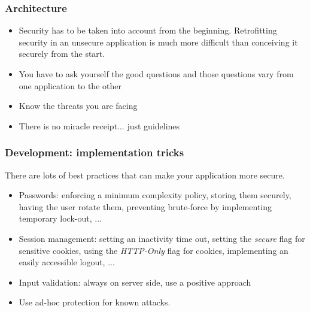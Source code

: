 \begin{frame}
\frametitle{Architecture}
\begin{itemize}
\item Security has to be taken into account from the beginning.
	\newline
	Retrofitting security in an unsecure application is much more difficult
	than conceiving it securely from the start.
\item You have to ask yourself the good questions and those questions vary
	from one application to the other
\item Know the threats you are facing
\item There is no miracle receipt... just guidelines
\end{itemize}
\end{frame}

\begin{frame}
\frametitle{Development: implementation tricks}

There are lots of best practices that can make your application more
secure.

\begin{itemize}
\item Passwords: enforcing a minimum complexity policy, storing them securely,
having the user rotate them, preventing brute-force by implementing temporary
lock-out, ...
\item Session management: setting an inactivity time out, setting the
\emph{secure} flag for sensitive cookies, using the \emph{HTTP-Only} flag for
cookies, implementing an easily accessible logout, ...
\item Input validation: always on server side, use a positive
  approach
\item Use ad-hoc protection for known attacks.
\end{itemize}
\end{frame}

